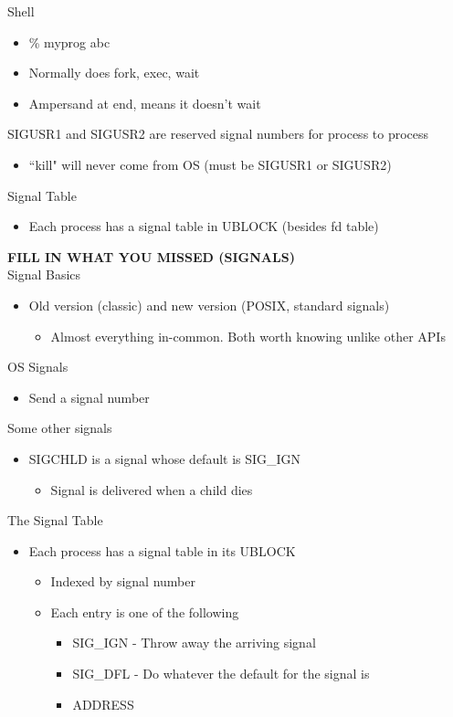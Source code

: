 Shell
\begin{itemize}
    \item \% myprog abc
    \item Normally does fork, exec, wait
    \item Ampersand at end, means it doesn't wait
\end{itemize}
SIGUSR1 and SIGUSR2 are reserved signal numbers for process to process
\begin{itemize}
    \item ``kill" will never come from OS (must be SIGUSR1 or SIGUSR2)
\end{itemize}
Signal Table
\begin{itemize}
    \item Each process has a signal table in UBLOCK (besides fd table)
\end{itemize}
\textbf{FILL IN WHAT YOU MISSED (SIGNALS)}\\
Signal Basics
\begin{itemize}
    \item Old version (classic) and new version (POSIX, standard signals)
    \begin{itemize}
        \item Almost everything in-common. Both worth knowing unlike other APIs
    \end{itemize}
\end{itemize}
OS Signals
\begin{itemize}
    \item Send a signal number
\end{itemize}
Some other signals
\begin{itemize}
    \item SIGCHLD is a signal whose default is SIG\_IGN
    \begin{itemize}
        \item Signal is delivered when a child dies
    \end{itemize}
\end{itemize}
The Signal Table
\begin{itemize}
    \item Each process has a signal table in its UBLOCK
    \begin{itemize}
        \item Indexed by signal number
        \item Each entry is one of the following
        \begin{itemize}
            \item SIG\_IGN - Throw away the arriving signal
            \item SIG\_DFL - Do whatever the default for the signal is
            \item ADDRESS
        \end{itemize}
    \end{itemize}
\end{itemize}
